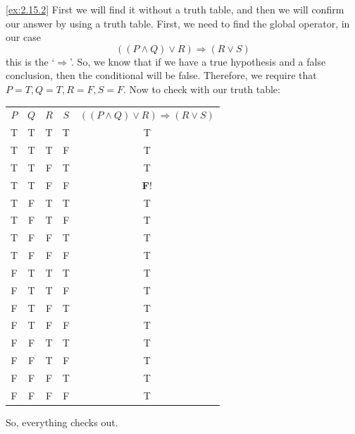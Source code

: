 \begin{solution}\label{sol:2.15.2}\ref{ex:2.15.2}
    First we will find it without a truth table, and then we will confirm our answer by using a truth table.\newline
    First, we need to find the global operator, in our case 
    $$
    ((P\land Q)\lor R)\Rightarrow (R\lor S)
    $$
    this is the `$\Rightarrow$'. So, we know that if we have a true hypothesis and a false conclusion, then the conditional will be false. Therefore, we require that $P=T,Q=T, R=F, S=F$. Now to check with our truth table:
    \begin{table}[H]
        \centering
        \begin{tabular}{ccccc}
            \toprule
            $P$ & $Q$ & $R$ & $S$ & $((P\land Q)\lor R)\Rightarrow (R\lor S)$\\
            T & T & T & T & T\\
            T & T & T & F & T\\
            T & T & F & T & T\\
            T & T & F & F & \textbf{F}!\\
            T & F & T & T & T\\
            T & F & T & F & T\\
            T & F & F & T & T\\
            T & F & F & F & T\\
            F & T & T & T & T\\
            F & T & T & F & T\\
            F & T & F & T & T\\
            F & T & F & F & T\\
            F & F & T & T & T\\
            F & F & T & F & T\\
            F & F & F & T & T\\
            F & F & F & F & T\\
            \bottomrule
        \end{tabular}
    \end{table}
    So, everything checks out.
\end{solution}

